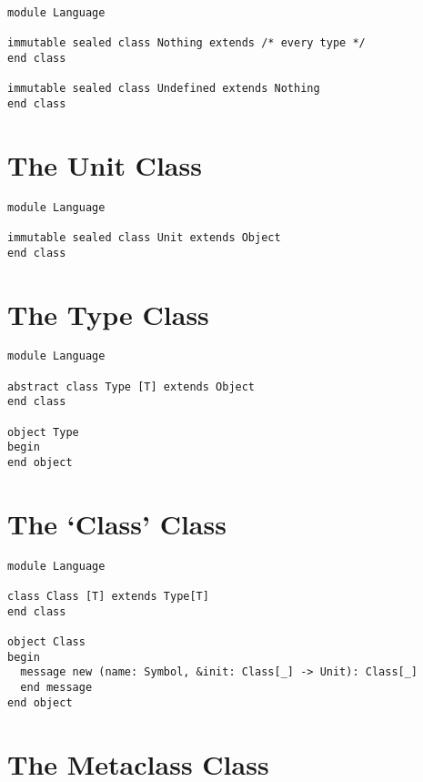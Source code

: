 \begin{lstlisting}
module Language

immutable sealed class Nothing extends /* every type */
end class

immutable sealed class Undefined extends Nothing
end class
\end{lstlisting}






\section{The Unit Class}
\label{sec:lang-unit}

\begin{lstlisting}
module Language

immutable sealed class Unit extends Object
end class
\end{lstlisting}






\section{The Type Class}
\label{sec:lang-type}

\begin{lstlisting}
module Language

abstract class Type [T] extends Object
end class

object Type
begin
end object
\end{lstlisting}







\section{The `Class' Class}
\label{sec:lang-class}

\begin{lstlisting}
module Language

class Class [T] extends Type[T]
end class

object Class
begin
  message new (name: Symbol, &init: Class[_] -> Unit): Class[_]
  end message
end object
\end{lstlisting}







\section{The Metaclass Class}
\label{sec:lang-metaclass}


